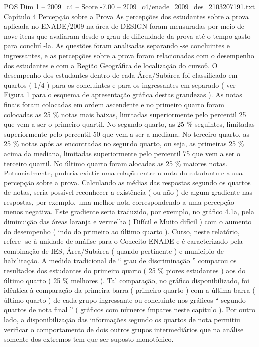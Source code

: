 \begin{textsample}{POS Dim 1 – 2009\_c4 – Score -7.00 – 2009\_c4/enade\_2009\_des\_2103207191.txt}  \label{ex:f1_pos_419}
Capítulo 4 Percepção sobre a Prova As percepções dos estudantes sobre a prova aplicada no ENADE/2009 na área de DESIGN foram mensuradas por meio de nove itens que avaliaram desde o grau de dificuldade da prova até o tempo gasto para concluí -la.
As questões foram analisadas separando -se concluintes e ingressantes, e as percepções sobre a prova foram relacionadas com o desempenho dos estudantes e com a Região Geográfica de localização do curso6.
O desempenho dos estudantes dentro de cada Área/Subárea foi classificado em quartos ( 1/4 ) para os concluintes e para os ingressantes em separado ( ver Figura 1 para o esquema de apresentação gráfica destas grandezas ).
As notas finais foram colocadas em ordem ascendente e no primeiro quarto foram colocadas as 25 \% notas mais baixas, limitadas superiormente pelo percentil 25 que vem a ser o primeiro quartil.
No segundo quarto, as 25 \% seguintes, limitadas superiormente pelo percentil 50 que vem a ser a mediana.
No terceiro quarto, as 25 \% notas após as encontradas no segundo quarto, ou seja, as primeiras 25 \% acima da mediana, limitadas superiormente pelo percentil 75 que vem a ser o terceiro quartil.
No último quarto foram alocadas as 25 \% maiores notas.
Potencialmente, poderia existir uma relação entre a nota do estudante e a sua percepção sobre a prova.
Calculando as médias das respostas segundo os quartos de notas, seria possível reconhecer a existência ( ou não ) de algum gradiente nas respostas, por exemplo, uma melhor nota correspondendo a uma percepção menos negativa.
Este gradiente seria traduzido, por exemplo, no gráfico 4.1a, pela diminuição das áreas laranja e vermelha ( Difícil e Muito difícil ) com o aumento do desempenho ( indo do primeiro ao último quarto ).
Curso, neste relatório, refere -se à unidade de análise para o Conceito ENADE e é caracterizado pela combinação de IES, Área/Subárea ( quando pertinente ) e município de habilitação.
A medida tradicional de “ grau de discriminação ” comparou os resultados dos estudantes do primeiro quarto ( 25 \% piores estudantes ) aos do último quarto ( 25 \% melhores ).
Tal comparação, no gráfico disponibilizado, foi idêntica à comparação da primeira barra ( primeiro quarto ) com a última barra ( último quarto ) de cada grupo ingressante ou concluinte nos gráficos “ segundo quartos de nota final ” ( gráficos com números ímpares neste capítulo ).
Por outro lado, a disponibilização das informações segundo os quartos de nota permitiu verificar o comportamento de dois outros grupos intermediários que na análise somente dos extremos tem que ser suposto monotônico.

\end{textsample}
